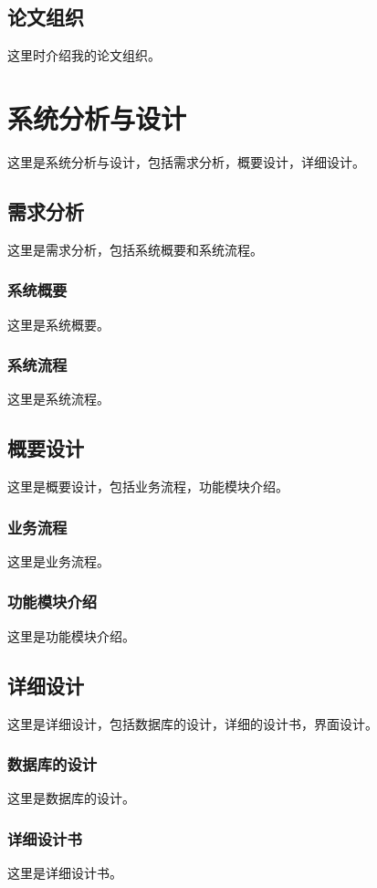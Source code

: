 \documentclass[a4paper]{ecnuthesis}
\begin{document}
\subsection{论文组织}
这里时介绍我的论文组织。

\section{系统分析与设计}
这里是系统分析与设计，包括需求分析，概要设计，详细设计。

\subsection{需求分析}
这里是需求分析，包括系统概要和系统流程。

\subsubsection{系统概要}
这里是系统概要。

\subsubsection{系统流程}
这里是系统流程。

\subsection{概要设计}
这里是概要设计，包括业务流程，功能模块介绍。

\subsubsection{业务流程}
这里是业务流程。

\subsubsection{功能模块介绍}
这里是功能模块介绍。

\subsection{详细设计}
这里是详细设计，包括数据库的设计，详细的设计书，界面设计。

\subsubsection{数据库的设计}
这里是数据库的设计。

\subsubsection{详细设计书}
这里是详细设计书。
\end{document}
